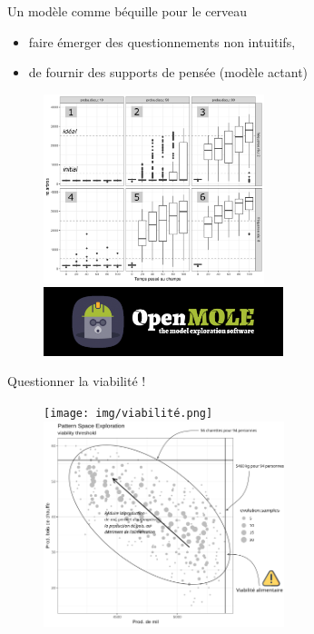 \documentclass[aspectratio=169]{beamer}
\begin{document}
\begin{frame}{Un modèle comme béquille pour le cerveau}
    \begin{center}
        \vspace{-1em}

        \begin{itemize}
            \item faire émerger des questionnements non intuitifs,
            \item de fournir des supports de pensée (modèle actant)
        \end{itemize}
        \begin{figure}
            \centering
            \includegraphics[height = 5.5cm]{img/boxplotReunionDiscussion.png}~
            \includegraphics[height = 2cm]{img/OpenMOLE-Banner.png}
        \end{figure}
    \end{center}
\end{frame}

\begin{frame}{Questionner la viabilité !}
    \begin{figure}
        \centering
        \texttt{[image: img/viabilité.png]}~
        \includegraphics[height = 6cm]{../../../img/om_pse.png}
    \end{figure}
\end{frame}
\end{document}
